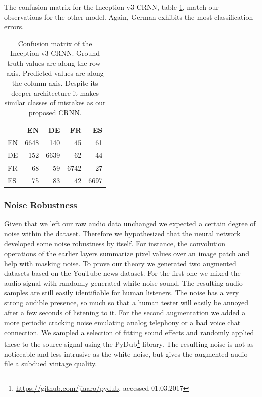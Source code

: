 	The confusion matrix for the Inception-v3 CRNN, table \ref{tab:language_family_inception}, match our observations for the other model. Again, German exhibits the most classification errors. 
	
	\begin{table}[]
	\centering
	\begin{tabularx}{\textwidth}{l|rrrr}
	      & EN     & DE     & FR     & ES \\ \midrule
	  EN  & \cellcolor{lightgray} 6648   & 140    & 45     & 61 \\
	  DE  & 152    & \cellcolor{lightgray} 6639   & 62     & 44 \\
	  FR  & 68     & 59     & \cellcolor{lightgray} 6742   & 27 \\
	  ES  & 75     & 83     & 42     & \cellcolor{lightgray} 6697 \\
	\end{tabularx}
	\caption{Confusion matrix of the Inception-v3 CRNN. Ground truth values are along the row-axis. Predicted values are along the column-axis. Despite its deeper architecture it makes similar classes of mistakes as our proposed CRNN. }
	\label{tab:language_family_inception}
	\end{table}
 

\subsubsection{Noise Robustness} 
\label{sec:noise_robustness}
Given that we left our raw audio data unchanged we expected a certain degree of noise within the dataset. Therefore we hypothesized that the neural network developed some noise robustness by itself. For instance, the convolution operations of the earlier layers summarize pixel values over an image patch and help with masking noise. To prove our theory we generated two augmented datasets based on the YouTube news dataset. 
For the first one we mixed the audio signal with randomly generated white noise sound. The resulting audio samples are still easily identifiable for human listeners. The noise has a very strong audible presence, so much so that a human tester will easily be annoyed after a few seconds of listening to it.
For the second augmentation we added a more periodic cracking noise emulating analog telephony or a bad voice chat connection. We sampled a selection of fitting sound effects and randomly applied these to the source signal using the PyDub\footnote{\url{https://github.com/jiaaro/pydub}, accessed 01.03.2017} library. The resulting noise is not as noticeable and less intrusive as the white noise, but gives the augmented audio file a subdued vintage quality.

